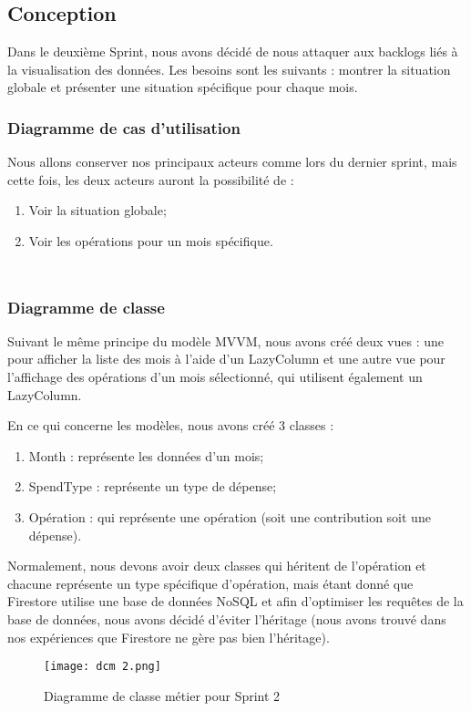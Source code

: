 \subsection{Conception}
Dans le deuxième Sprint, nous avons décidé de nous attaquer aux backlogs liés à la visualisation des données. Les besoins sont les suivants : montrer la situation globale et présenter une situation spécifique pour chaque mois.
\subsubsection{Diagramme de cas d'utilisation}
Nous allons conserver nos principaux acteurs comme lors du dernier sprint, mais cette fois, les deux acteurs auront la possibilité de :
\begin{enumerate}
  \item Voir la situation globale;
  \item Voir les opérations pour un mois spécifique.
\end{enumerate}
$ $

$ $
\newpage
\subsubsection{Diagramme de classe}
Suivant le même principe du modèle MVVM, nous avons créé deux vues : une pour afficher la liste des mois à l'aide d'un LazyColumn et une autre vue pour l'affichage des opérations d'un mois sélectionné, qui utilisent également un LazyColumn.

En ce qui concerne les modèles, nous avons créé 3 classes :
\begin{enumerate}
  \item Month : représente les données d'un mois;
  \item SpendType : représente un type de dépense;
  \item Opération : qui représente une opération (soit une contribution soit une dépense).
\end{enumerate}

Normalement, nous devons avoir deux classes qui héritent de l'opération et chacune représente un type spécifique d'opération, mais étant donné que Firestore utilise une base de données NoSQL et afin d'optimiser les requêtes de la base de données, nous avons décidé d'éviter l'héritage (nous avons trouvé dans nos expériences que Firestore ne gère pas bien l'héritage).
 \begin{figure}[htb!]
        \centering
        \texttt{[image: dcm 2.png]}
        \caption{Diagramme de classe métier pour Sprint 2}
    \end{figure}

